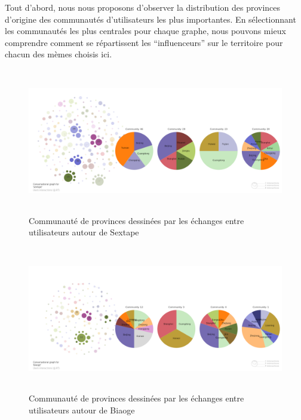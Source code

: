 Tout d{\textquoteright}abord, nous nous proposons d{\textquoteright}observer la distribution des provinces d{\textquoteright}origine des communaut\'es d{\textquoteright}utilisateurs les plus importantes. En s\'electionnant les communaut\'es les plus centrales pour chaque graphe, nous pouvons mieux comprendre comment se r\'epartissent les {\textquotedblleft}influenceurs{\textquotedblright} sur le territoire pour chacun des m\`emes choisis ici.

\begin{figure}[H]
    \centering
    \includegraphics[width=5.9996in,height=2.5004in]{figures/chap4/chapitre4-img54.png}
    \caption{
        Communaut\'e de provinces dessin\'ees par les \'echanges entre utilisateurs autour de Sextape
    }
    \label{fig:sextape-users-pie}
\end{figure}

\begin{figure}[H]
    \centering     
    \includegraphics[width=5.9996in,height=2.5004in]{figures/chap4/chapitre4-img55.png}
    \caption{
        Communaut\'e de provinces dessin\'ees par les \'echanges entre utilisateurs autour de Biaoge
    }
    \label{fig:biaoge-users-pie}
\end{figure}

 

